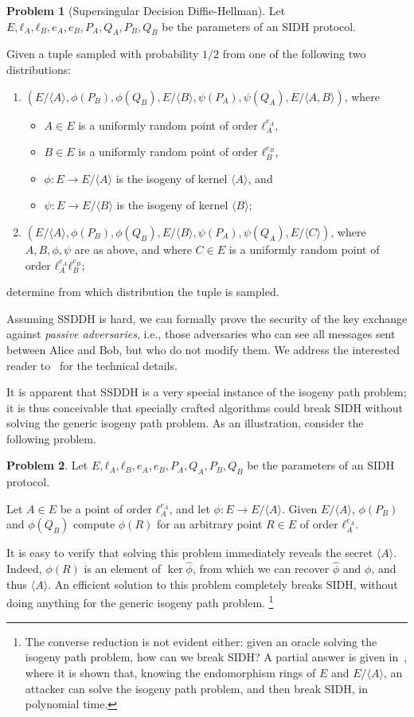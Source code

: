 \documentclass[10pt]{article}
\theoremstyle{plain}
\theoremstyle{definition}
\newtheorem{problem}{Problem}
\begin{document}
\begin{problem}[Supersingular Decision Diffie-Hellman]
  Let $E,ℓ_A,ℓ_B,e_A,e_B,P_A,Q_A,P_B,Q_B$ be the parameters of an SIDH
  protocol.

  Given a tuple sampled with probability $1/2$ from one of
  the following two distributions:
  \begin{enumerate} 
  \item $(E/〈A〉, ϕ(P_B), ϕ(Q_B), E/〈B〉, ψ(P_A), ψ(Q_A), E/〈A,B〉)$, where
    \begin{itemize}
    \item $A∈E$ is a uniformly random point of order $ℓ_A^{e_A}$,
    \item $B∈E$ is a uniformly random point of order $ℓ_B^{e_B}$,
    \item $ϕ:E\to E/〈A〉$ is the isogeny of kernel $〈A〉$, and
    \item $ψ:E \to E/〈B〉$ is the isogeny of kernel $〈B〉$;
    \end{itemize}
  \item $(E/〈A〉, ϕ(P_B), ϕ(Q_B), E/〈B〉, ψ(P_A), ψ(Q_A), E/〈C〉)$,
    where $A,B,ϕ,ψ$ are as above, and where $C∈E$ is a uniformly random
    point of order $ℓ_A^{e_A}ℓ_B^{e_B}$;
  \end{enumerate}
  determine from which distribution the tuple is sampled.
\end{problem}

Assuming SSDDH is hard, we can formally prove the security of the key
exchange against \emph{passive adversaries}, i.e., those adversaries
who can see all messages sent between Alice and Bob, but who do not
modify them. %
We address the interested reader to~\cite{defeo+jao+plut12} for the
technical details.

It is apparent that SSDDH is a very special instance of the isogeny
path problem; it is thus conceivable that specially crafted algorithms
could break SIDH without solving the generic isogeny path problem. %
As an illustration, consider the following problem.

\begin{problem}
  Let $E,ℓ_A,ℓ_B,e_A,e_B,P_A,Q_A,P_B,Q_B$ be the parameters of an SIDH
  protocol.

  Let $A∈E$ be a point of order $ℓ_A^{e_A}$, and let $ϕ:E\to E/〈A〉$. %
  Given $E/〈Α〉$, $ϕ(P_B)$ and $ϕ(Q_B)$ compute $ϕ(R)$ for an
  arbitrary point $R∈E$ of order $ℓ_A^{e_A}$.
\end{problem}

It is easy to verify that solving this problem immediately reveals the
secret $〈A〉$. Indeed, $ϕ(R)$ is an element of $\ker\hat{ϕ}$, from
which we can recover $\hat{ϕ}$ and $ϕ$, and thus $〈A〉$. %
An efficient solution to this problem completely breaks SIDH, without
doing anything for the generic isogeny path problem.%
\footnote{The converse reduction is not evident either: given an
  oracle solving the isogeny path problem, how can we break SIDH? %
  A partial answer is given
  in~\cite{kohel2014quaternion,galbraithsecurity}, where it is shown
  that, knowing the endomorphism rings of $E$ and $E/〈A〉$, an
  attacker can solve the isogeny path problem, and then break SIDH, in
  polynomial time.}
\end{document}
